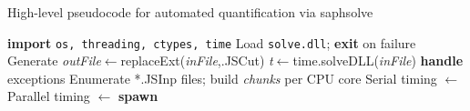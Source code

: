\begin{algorithm}[H]
\caption{High-level pseudocode for automated quantification via \acrshort{saphsolve}}
\label{alg:saphsolve_autoquantification}
\begin{algorithmic}[1]
\State \textbf{import} \texttt{os, threading, ctypes, time}
\State Load \texttt{solve.dll}; \textbf{exit} on failure
  \State Generate \textit{outFile}$\leftarrow$replaceExt(\textit{inFile},.JSCut)
  \State \textit{t}$\gets$time.solveDLL(\textit{inFile})
  \State \textbf{handle} exceptions
\EndFunction
{}
    \EndFor
\EndFunction
{}
  \State Enumerate *.JSInp files; build \textit{chunks} per CPU core
  \State Serial timing $\gets$ 
  \State Parallel timing $\gets$ \textbf{spawn} 
\EndFunction
\end{algorithmic}
\end{algorithm}